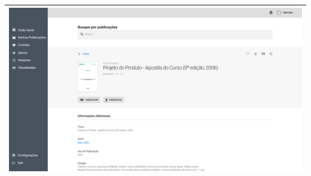 \begin{table}[H]
\begin{tabular}{|p{1cm}|p{14cm}|}
        \multicolumn{2}{|c|}{\includegraphics[scale=0.41]{img/resoar-view-research.png}}                                                                                                                                                                                                                                                                                                                                                         \\ \hline
    \end{tabular}
\end{table}

